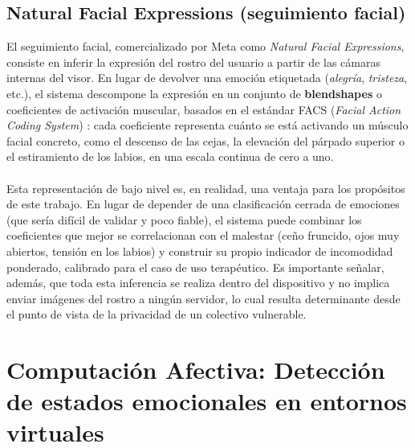 \documentclass[12pt,twoside,titlepage]{report}
\begin{document}
\subsection{Natural Facial Expressions (seguimiento facial)}

El seguimiento facial, comercializado por Meta como \textit{Natural Facial Expressions}, consiste en inferir la expresión del rostro del usuario a partir de las cámaras internas del visor.
En lugar de devolver una emoción etiquetada (\textit{alegría}, \textit{tristeza}, etc.), el sistema descompone la expresión en un conjunto de \textbf{blendshapes} o coeficientes de activación muscular, basados en el estándar FACS (\textit{Facial Action Coding System}) \parencite{ekman1978}: cada coeficiente representa cuánto se está activando un músculo facial concreto, como el descenso de las cejas, la elevación del párpado superior o el estiramiento de los labios, en una escala continua de cero a uno.\\
\\
Esta representación de bajo nivel es, en realidad, una ventaja para los propósitos de este trabajo.
En lugar de depender de una clasificación cerrada de emociones (que sería difícil de validar y poco fiable), el sistema puede combinar los coeficientes que mejor se correlacionan con el malestar (ceño fruncido, ojos muy abiertos, tensión en los labios) y construir su propio indicador de incomodidad ponderado, calibrado para el caso de uso terapéutico.
Es importante señalar, además, que toda esta inferencia se realiza dentro del dispositivo y no implica enviar imágenes del rostro a ningún servidor, lo cual resulta determinante desde el punto de vista de la privacidad de un colectivo vulnerable.

\section{Computación Afectiva: Detección de estados emocionales en entornos virtuales}
\end{document}
